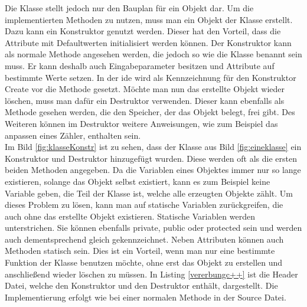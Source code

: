 Die Klasse stellt jedoch nur den Bauplan für ein Objekt dar. Um die implementierten Methoden zu nutzen, muss man ein Objekt der Klasse erstellt. Dazu kann ein \glqq Konstruktor\grqq{} genutzt werden. Dieser hat den Vorteil, dass die Attribute mit Defaultwerten initialisiert werden können. Der \glqq Konstruktor\grqq{} kann als normale Methode angesehen werden, die jedoch so wie die Klasse benannt sein muss. Er kann deshalb auch Eingabeparameter besitzen und Attribute auf bestimmte Werte setzen. In der \ac{ide} wird als Kennzeichnung für den Konstruktor \glqq Create\grqq{} vor die Methode gesetzt. Möchte man nun das erstellte Objekt wieder löschen, muss man dafür ein  \glqq Destruktor\grqq{} verwenden. Dieser kann ebenfalls als Methode gesehen werden, die den Speicher, der das Objekt belegt, frei gibt. Des Weiteren können im  \glqq Destruktor\grqq{} weitere Anweisungen, wie zum Beispiel das anpassen eines Zähler, enthalten sein.\\
 Im Bild \ref{fig:klasseKonstr} ist zu sehen, dass der Klasse aus Bild \ref{fig:eineklasse} ein \glqq Konstruktor\grqq{} und \glqq Destruktor\grqq{} hinzugefügt wurden. Diese werden oft als die ersten beiden Methoden angegeben.
  Da die Variablen eines Objektes immer nur so lange existieren, solange das Objekt selbst existiert, kann es zum Beispiel keine Variable geben, die Teil der Klasse ist, welche alle erzeugten Objekte zählt. Um dieses Problem zu lösen, kann man auf statische Variablen  zurückgreifen, die auch ohne das erstellte Objekt existieren. Statische Variablen werden unterstrichen. Sie können ebenfalls   \glqq private\grqq{}, \glqq public\grqq{} oder  \glqq protected\grqq{} sein und werden auch dementsprechend gleich gekennzeichnet. Neben Attributen können auch Methoden statisch sein. Dies ist ein Vorteil, wenn man nur eine bestimmte Funktion der Klasse benutzen möchte, ohne erst das Objekt zu erstellen und anschließend wieder löschen zu müssen. In Listing \ref{vererbungc++} ist die Header Datei, welche den Konstruktor und den Destruktor enthält, dargestellt. Die Implementierung erfolgt wie bei einer normalen Methode in der Source Datei. 
